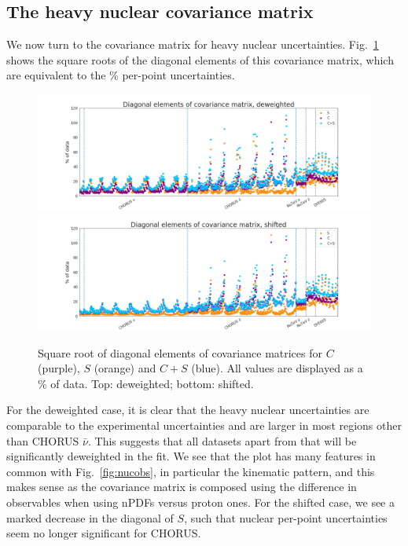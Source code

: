 \subsection{The heavy nuclear covariance matrix}
We now turn to the covariance matrix for heavy nuclear uncertainties. Fig.~\ref{fig:nuccov1} shows the square roots of the diagonal elements of this covariance matrix, which are equivalent to the \% per-point uncertainties. 
\begin{figure}[h]
  \begin{center}
    \includegraphics[width=\linewidth, trim={4cm 0 4cm 0}]{nuclear/plots//diag_covmat_deweighted.png}
        \includegraphics[width=\linewidth, trim={4cm 0 4cm 0}]{nuclear/plots/diag_covmat_shifted.png}
    \caption{Square root of diagonal elements of covariance matrices for $C$ (purple), $S$ (orange) and $C+S$ (blue). All values are displayed as a \% of data. Top: deweighted; bottom: shifted.
    \label{fig:nuccov1} }
    \end{center}
\end{figure}   
For the deweighted case, it is clear that the heavy nuclear uncertainties are comparable to the experimental uncertainties and are larger in most regions other than CHORUS $\bar{\nu}$. This suggests that all datasets apart from that will be significantly deweighted in the fit. We see that the plot has many features in common with Fig.~\ref{fig:nucobs}, in particular the kinematic pattern, and this makes sense as the covariance matrix is composed using the difference in observables when using nPDFs versus proton ones. For the shifted case, we see a marked decrease in the diagonal of $S$, such that nuclear per-point uncertainties seem no longer significant for CHORUS.
 
